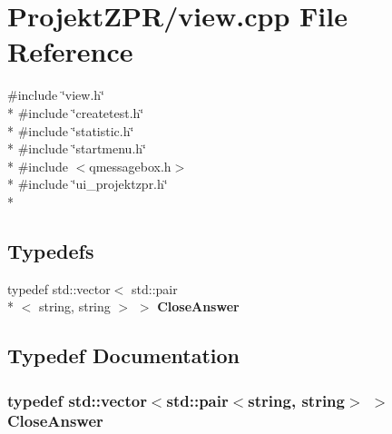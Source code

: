 \section{Projekt\-Z\-P\-R/view.cpp File Reference}
\label{view_8cpp}
{\ttfamily \#include \char`\"{}view.\-h\char`\"{}}\\*
{\ttfamily \#include \char`\"{}createtest.\-h\char`\"{}}\\*
{\ttfamily \#include \char`\"{}statistic.\-h\char`\"{}}\\*
{\ttfamily \#include \char`\"{}startmenu.\-h\char`\"{}}\\*
{\ttfamily \#include $<$qmessagebox.\-h$>$}\\*
{\ttfamily \#include \char`\"{}ui\-\_\-projektzpr.\-h\char`\"{}}\\*
\subsection*{Typedefs}
\begin{DoxyCompactItemize}
\item 
typedef std\-::vector$<$ std\-::pair\\*
$<$ string, string $>$ $>$ {\bf Close\-Answer}
\end{DoxyCompactItemize}


\subsection{Typedef Documentation}
\subsubsection[{Close\-Answer}]{\setlength{\rightskip}{0pt plus 5cm}typedef std\-::vector$<$std\-::pair$<$string, string$>$ $>$ {\bf Close\-Answer}}\label{view_8cpp_aa1cedac46506965b303979e4dbaa224b}

